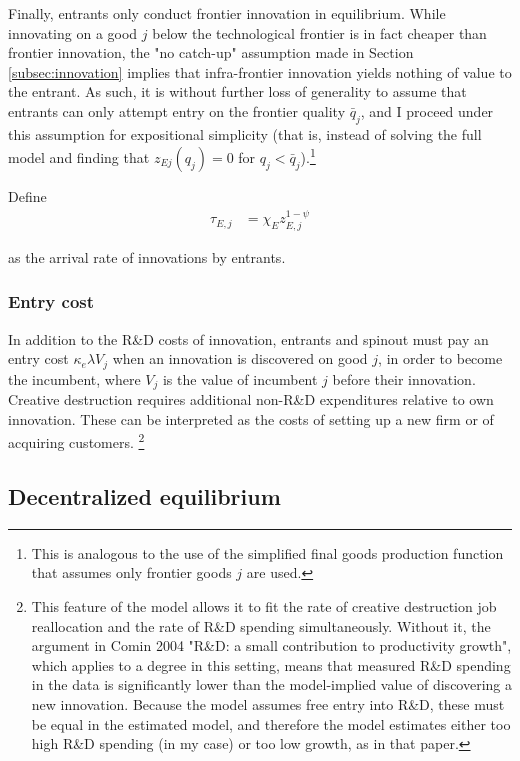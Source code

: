 \documentclass[11pt,english]{article}
\theoremstyle{remark}
\begin{document}
Finally, entrants only conduct frontier innovation in equilibrium. While innovating on a good $j$ below the technological frontier is in fact cheaper than frontier innovation, the "no catch-up" assumption made in Section \ref{subsec:innovation} implies that infra-frontier innovation yields nothing of value to the entrant. As such, it is without further loss of generality to assume that entrants can only attempt entry on the frontier quality $\bar{q}_j$, and I proceed under this assumption for expositional simplicity (that is, instead of solving the full model and finding that $z_{Ej}(q_j) = 0$ for $q_j < \bar{q}_j$).\footnote{This is analogous to the use of the simplified final goods production function that assumes only frontier goods $j$ are used.}

Define
\begin{align*}
	\tau_{E,j} &= \chi_E z_{E,j}^{1-\psi}
\end{align*}

as the arrival rate of innovations by entrants.


\subsubsection{Entry cost}

In addition to the R\&D costs of innovation, entrants and spinout must pay an entry cost $\kappa_{e} \lambda V_{j}$ when an innovation is discovered on good $j$, in order to become the incumbent, where $V_{j}$ is the value of incumbent $j$ before their innovation. Creative destruction requires additional non-R\&D expenditures relative to own innovation. These can be interpreted as the costs of setting up a new firm or of acquiring customers. \footnote{This feature of the model allows it to fit the rate of creative destruction job reallocation and the rate of R\&D spending simultaneously. Without it, the argument in Comin 2004 "R\&D: a small contribution to productivity growth", which applies to a degree in this setting, means that measured R\&D spending in the data is significantly lower than the model-implied value of discovering a new innovation. Because the model assumes free entry into R\&D, these must be equal in the estimated model, and therefore the model estimates either too high R\&D spending (in my case) or too low growth, as in that paper.}


\subsection{Decentralized equilibrium}
\end{document}
